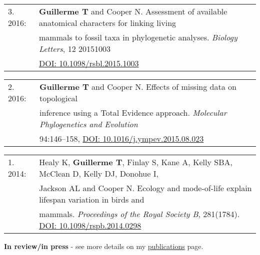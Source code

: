 \documentclass[10pt,a4paper]{article}
\begin{document}
{\bigskip

\begin{tabular}{ll}
3. 2016: &\textbf{Guillerme T} and Cooper N. Assessment of available anatomical characters for linking living\\
      & mammals to fossil taxa in phylogenetic analyses. \textit{Biology Letters}, 12 20151003\\
      & \href{http://rsbl.royalsocietypublishing.org/content/12/5/20151003}{DOI: 10.1098/rsbl.2015.1003}\\ %
\end{tabular}

\bigskip

\begin{tabular}{ll}
2. 2016: & \textbf{Guillerme T} and Cooper N. Effects of missing data on topological\\
      & inference using a Total Evidence approach. \textit{Molecular Phylogenetics and Evolution}\\
      & 94:146–158, \href{http://goo.gl/bVGrQJ}{DOI: 10.1016/j.ympev.2015.08.023}\\
\end{tabular}

\bigskip

\begin{tabular}{ll}
1. 2014: & Healy K, \textbf{Guillerme T}, Finlay S, Kane A, Kelly SBA, McClean D, Kelly DJ, Donohue I,\\
      & Jackson AL and Cooper N. Ecology and mode-of-life explain lifespan variation in birds and \\
      & mammals. \textit{Proceedings of the Royal Society B}, 281(1784). \href{http://rspb.royalsocietypublishing.org/content/281/1784/20140298}{DOI: 10.1098/rspb.2014.0298}\\ %
\end{tabular}

\bigskip

\raggedright\textbf{In review/in press} - see more details on my \href{http://tguillerme.github.io/publications.html}{publications} page.



}
\end{document}
